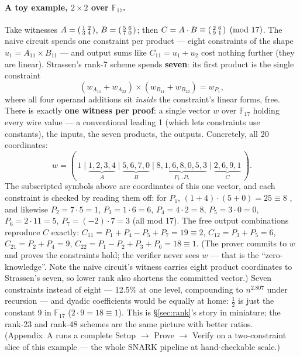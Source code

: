 \documentclass[10pt]{article}
\begin{document}
\paragraph{A toy example, $2\times2$ over $\mathbb{F}_{17}$.} Take
witnesses $A = \begin{psmallmatrix}1&2\\3&4\end{psmallmatrix}$,
$B = \begin{psmallmatrix}5&6\\7&0\end{psmallmatrix}$; then
$C = A\cdot B \equiv \begin{psmallmatrix}2&6\\9&1\end{psmallmatrix}
\pmod{17}$. The naive circuit spends one constraint per product ---
eight constraints of the shape $u_1 = A_{11}\times B_{11}$ --- and
output sums like $C_{11} = u_1 + u_2$ cost nothing further (they are
linear). Strassen's rank-7 scheme spends \textbf{seven}: its first
product is the single constraint
\[
( w_{A_{11}} + w_{A_{22}} ) \times ( w_{B_{11}} + w_{B_{22}} )
  = w_{P_1},
\]
where all four operand additions sit \emph{inside} the constraint's
linear forms, free. There is exactly \textbf{one witness per proof}:
a single vector $w$ over $\mathbb{F}_{17}$ holding every wire value
--- a conventional leading 1 (which lets constraints use constants),
the inputs, the seven products, the outputs. Concretely, all 20
coordinates:
\[
w = (\,1 \mid \underbrace{1,2,3,4}_{A} \mid \underbrace{5,6,7,0}_{B}
      \mid \underbrace{8,1,6,8,0,5,3}_{P_1..P_7}
      \mid \underbrace{2,6,9,1}_{C}\,).
\]
The subscripted symbols above are coordinates of this one vector,
and each constraint is checked by reading them off: for $P_1$,
$(1+4)\cdot(5+0) = 25 \equiv 8$ \checkmark, and likewise
$P_2 = 7\cdot5 = 1$, $P_3 = 1\cdot6 = 6$, $P_4 = 4\cdot2 = 8$,
$P_5 = 3\cdot0 = 0$, $P_6 = 2\cdot11 = 5$, $P_7 = (-2)\cdot7 = 3$
(all mod 17). The free output combinations reproduce $C$ exactly:
$C_{11} = P_1{+}P_4{-}P_5{+}P_7 = 19 \equiv 2$,
$C_{12} = P_3{+}P_5 = 6$, $C_{21} = P_2{+}P_4 = 9$,
$C_{22} = P_1{-}P_2{+}P_3{+}P_6 = 18 \equiv 1$. (The prover commits
to $w$ and proves the constraints hold; the verifier never sees $w$
--- that is the ``zero-knowledge''. Note the naive circuit's witness
carries eight product coordinates to Strassen's seven, so lower rank
also shortens the committed vector.) Seven constraints instead of
eight --- 12.5\% at one level, compounding to $n^{2.807}$ under
recursion --- and dyadic coefficients would be equally at home:
$\tfrac12$ is just the constant 9 in $\mathbb{F}_{17}$
($2\cdot9 = 18 \equiv 1$). This is \S\ref{sec:rank}'s story in
miniature; the rank-23 and rank-48 schemes are the same picture with
better ratios. (Appendix~A runs a complete Setup
$\to$ Prove $\to$ Verify on a two-constraint slice of this example
--- the whole SNARK pipeline at hand-checkable scale.)
\end{document}
